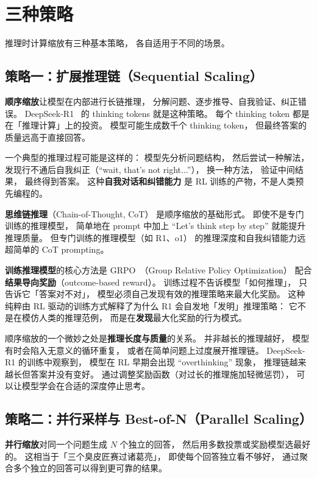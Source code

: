 \section{三种策略}

推理时计算缩放有三种基本策略，
各自适用于不同的场景。

\subsection{策略一：扩展推理链（Sequential Scaling）}

\textbf{顺序缩放}让模型在内部进行长链推理，
分解问题、逐步推导、自我验证、纠正错误。
DeepSeek-R1~\cite{deepseekr1} 的 thinking tokens 就是这种策略。
每个 thinking token 都是在「推理计算」上的投资。
模型可能生成数千个 thinking token，
但最终答案的质量远高于直接回答。

一个典型的推理过程可能是这样的：
模型先分析问题结构，
然后尝试一种解法，
发现行不通后自我纠正（“wait, that's not right...”），
换一种方法，
验证中间结果，
最终得到答案。
这种\textbf{自我对话和纠错能力}
是 RL 训练的产物，不是人类预先编程的。

\textbf{思维链推理}（Chain-of-Thought, CoT）
是顺序缩放的基础形式。
即使不是专门训练的推理模型，
简单地在 prompt 中加上
“Let's think step by step” 就能提升推理质量。
但专门训练的推理模型（如 R1、o1）
的推理深度和自我纠错能力远超简单的 CoT prompting。

\textbf{训练推理模型}的核心方法是
GRPO~\cite{shao2024grpo}（Group Relative Policy Optimization）
配合\textbf{结果导向奖励}（outcome-based reward）。
训练过程不告诉模型「如何推理」，
只告诉它「答案对不对」，
模型必须自己发现有效的推理策略来最大化奖励。
这种纯粹由 RL 驱动的训练方式解释了为什么
R1 会自发地「发明」推理策略：
它不是在模仿人类的推理范例，
而是在\textbf{发现}最大化奖励的行为模式。

顺序缩放的一个微妙之处是\textbf{推理长度与质量}的关系。
并非越长的推理越好，
模型有时会陷入无意义的循环重复，
或者在简单问题上过度展开推理链。
DeepSeek-R1 的训练中观察到，
模型在 RL 早期会出现 “overthinking” 现象，
推理链越来越长但答案并没有变好。
通过调整奖励函数（对过长的推理施加轻微惩罚），
可以让模型学会在合适的深度停止思考。

\subsection{策略二：并行采样与 Best-of-N（Parallel Scaling）}

\textbf{并行缩放}对同一个问题生成 $N$ 个独立的回答，
然后用多数投票或奖励模型选最好的。
这相当于「三个臭皮匠赛过诸葛亮」，
即使每个回答独立看不够好，
通过聚合多个独立的回答可以得到更可靠的结果。

